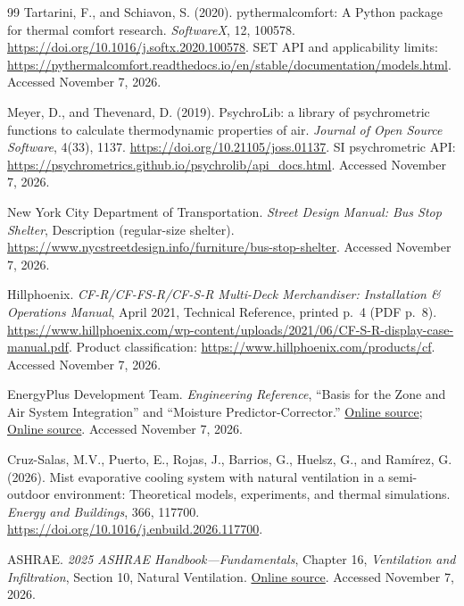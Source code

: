\documentclass[12pt]{article}
\begin{document}
\begin{thebibliography}{99}
Tartarini, F., and Schiavon, S. (2020).
pythermalcomfort: A Python package for thermal comfort research.
\emph{SoftwareX}, 12, 100578.
\url{https://doi.org/10.1016/j.softx.2020.100578}.
SET API and applicability limits:
\url{https://pythermalcomfort.readthedocs.io/en/stable/documentation/models.html}.
Accessed November 7, 2026.

Meyer, D., and Thevenard, D. (2019).
PsychroLib: a library of psychrometric functions to calculate thermodynamic properties of air.
\emph{Journal of Open Source Software}, 4(33), 1137.
\url{https://doi.org/10.21105/joss.01137}.
SI psychrometric API:
\url{https://psychrometrics.github.io/psychrolib/api_docs.html}.
Accessed November 7, 2026.

New York City Department of Transportation.
\emph{Street Design Manual: Bus Stop Shelter}, Description (regular-size shelter).
\url{https://www.nycstreetdesign.info/furniture/bus-stop-shelter}.
Accessed November 7, 2026.

Hillphoenix. \emph{CF-R/CF-FS-R/CF-S-R Multi-Deck Merchandiser: Installation \& Operations Manual}, April 2021, Technical Reference, printed p.~4 (PDF p.~8).
\url{https://www.hillphoenix.com/wp-content/uploads/2021/06/CF-S-R-display-case-manual.pdf}.
Product classification: \url{https://www.hillphoenix.com/products/cf}.
Accessed November 7, 2026.

EnergyPlus Development Team. \emph{Engineering Reference},
``Basis for the Zone and Air System Integration'' and ``Moisture Predictor-Corrector.''
\href{https://energyplus.readthedocs.io/en/latest/guides/engineering-reference/2.1-basis-for-the-zone-and-air-system-integration.html}{Online source};
\href{https://energyplus.readthedocs.io/en/latest/guides/engineering-reference/2.4-moisture-predictor-corrector.html}{Online source}.
Accessed November 7, 2026.

Cruz-Salas, M.V., Puerto, E., Rojas, J., Barrios, G., Huelsz, G., and Ram\'irez, G. (2026).
Mist evaporative cooling system with natural ventilation in a semi-outdoor environment: Theoretical models, experiments, and thermal simulations.
\emph{Energy and Buildings}, 366, 117700.
\url{https://doi.org/10.1016/j.enbuild.2026.117700}.

ASHRAE. \emph{2025 ASHRAE Handbook---Fundamentals}, Chapter 16,
\emph{Ventilation and Infiltration}, Section 10, Natural Ventilation.
\href{https://handbook.ashrae.org/Handbooks/F25/SI/F25_Ch16/F25_Ch16_si.aspx}{Online source}.
Accessed November 7, 2026.


\end{thebibliography}
\end{document}

